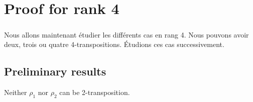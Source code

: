 \chapter{Proof for rank 4}

\paragraph{}
Nous allons maintenant étudier les différents cas en rang 4. Nous pouvons avoir deux, trois ou quatre 4-transpositions. Étudions ces cas successivement.

\section{Preliminary results}

\begin{theorem}
  Neither $\rho_1$ nor $\rho_2$ can be 2-transposition.
\end{theorem}

